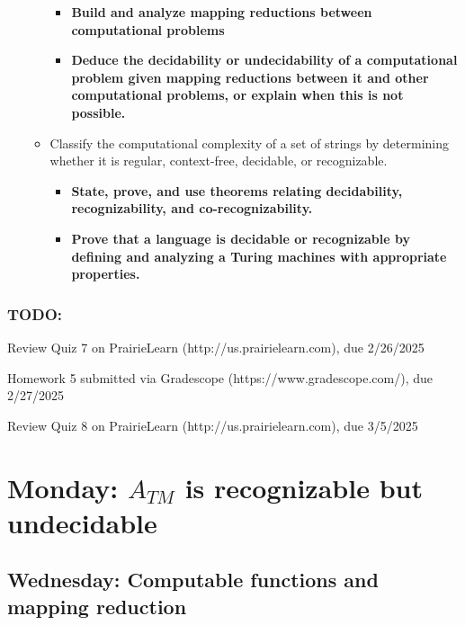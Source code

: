 \begin{itemize}
\begin{itemize}
\begin{itemize}
              \item {\bf Build and analyze mapping reductions between computational problems}
              \item {\bf Deduce the decidability or undecidability of a computational problem given mapping reductions between it and other computational problems, or explain when this is not possible.}
           \end{itemize}
    \item Classify the computational complexity of a set of strings by determining whether it is regular, context-free, decidable, or recognizable.
    \begin{itemize}
    \item {\bf State, prove, and use theorems relating decidability, recognizability, and co-recognizability.}
    \item {\bf Prove that a language is decidable or recognizable by defining and analyzing a Turing machines with appropriate properties.}
\end{itemize}
\end{itemize}
\end{itemize}

\vspace{-20pt}

\subsubsection*{TODO:}
\begin{list}{\itemsep-10pt}
   \item Review Quiz 7 on PrairieLearn (http://us.prairielearn.com), due 2/26/2025
   \item Homework 5 submitted via Gradescope (https://www.gradescope.com/), due 2/27/2025
   \item Review Quiz 8 on PrairieLearn (http://us.prairielearn.com), due 3/5/2025
\end{list}

\newpage

\section*{Monday: $A_{TM}$ is recognizable but undecidable}


    
\newpage
\subsection*{Wednesday: Computable functions and mapping reduction}

